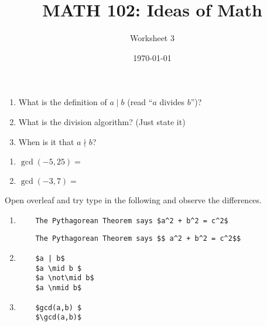 \documentclass[12pt]{amsart}
\title{ MATH 102: Ideas  of Math }
\author{ Worksheet 3 }
\date{\today}
\begin{document}
\maketitle

\begin{question}
	\begin{enumerate}
		\item What is the definition of $a \mid b$ (read ``$a$ divides $b$'')?
		      \vspace{2cm}
		\item What is the division algorithm? (Just state it)
		      \vspace{2cm}
		\item When is it that $a\nmid b$?
		      \vspace{2cm}
	\end{enumerate}
\end{question}

\begin{question}
	\begin{enumerate}
		\item   $\gcd(-5,25) = $
		      \vspace{2cm}
		\item $\gcd(-3, 7) = $
		      \vspace{2cm}
	\end{enumerate}
\end{question}

\begin{question}
	Open overleaf and try type in the following and observe the differences.

	\begin{enumerate}
		\item
		      \begin{verbatim}
    The Pythagorean Theorem says $a^2 + b^2 = c^2$
                \end{verbatim}
		      \begin{verbatim} 
    The Pythagorean Theorem says $$ a^2 + b^2 = c^2$$ 
            \end{verbatim}
		\item \begin{verbatim}
    $a | b$ 
    $a \mid b $
    $a \not\mid b$
    $a \nmid b$
                \end{verbatim}
		\item \begin{verbatim}
    $gcd(a,b) $
    $\gcd(a,b)$
            \end{verbatim}
	\end{enumerate}
\end{question}
\end{document}

